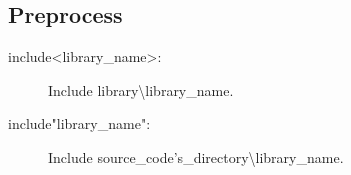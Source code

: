 \subsection{Preprocess}

\begin{description}
    \item[include\textless{}library\_name\textgreater{}:] Include library\textbackslash{}library\_name.
    \item[include"library\_name":] Include source\_code's\_directory\textbackslash{}library\_name.
\end{description}
